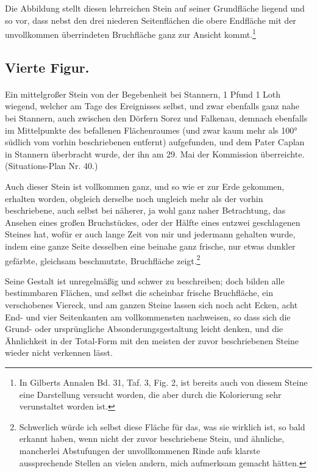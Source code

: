 \documentclass[a4paper, 11pt, oneside, german]{article}
\begin{document}
Die Abbildung stellt diesen lehrreichen Stein auf seiner Grundfläche liegend und so vor, dass nebst den drei niederen Seitenflächen die obere Endfläche mit der unvollkommen überrindeten Bruchfläche ganz zur Ansicht kommt.\footnote{In Gilberts Annalen Bd. 31, Taf. 3, Fig. 2, ist bereits auch von diesem Steine eine Darstellung versucht worden, die aber durch die Kolorierung sehr verunstaltet worden ist.}

\subsection{Vierte Figur.}
\paragraph{}
Ein mittelgroßer Stein von der Begebenheit bei Stannern, 1 Pfund 1 Loth wiegend, welcher am Tage des Ereignisses selbst, und zwar ebenfalls ganz nahe bei Stannern, auch zwischen den Dörfern Sorez und Falkenau, demnach ebenfalls im Mittelpunkte des befallenen Flächenraumes (und zwar kaum mehr als 100° südlich vom vorhin beschriebenen entfernt) aufgefunden, und dem Pater Caplan in Stannern überbracht wurde, der ihn am 29. Mai der Kommission überreichte. (Situations-Plan Nr. 40.)

Auch dieser Stein ist vollkommen ganz, und so wie er zur Erde gekommen, erhalten worden, obgleich derselbe noch ungleich mehr als der vorhin beschriebene, auch selbst bei näherer, ja wohl ganz naher Betrachtung, das Ansehen eines großen Bruchstückes, oder der Hälfte eines entzwei geschlagenen Steines hat, wofür er auch lange Zeit von mir und jedermann gehalten wurde, indem eine ganze Seite desselben eine beinahe ganz frische, nur etwas dunkler gefärbte, gleichsam beschmutzte, Bruchfläche zeigt.\footnote{Schwerlich würde ich selbst diese Fläche für das, was sie wirklich ist, so bald erkannt haben, wenn nicht der zuvor beschriebene Stein, und ähnliche, mancherlei Abstufungen der unvollkommenen Rinde aufs klarste aussprechende Stellen an vielen andern, mich aufmerksam gemacht hätten.}

Seine Gestalt ist unregelmäßig und schwer zu beschreiben; doch bilden alle bestimmbaren Flächen, und selbst die scheinbar frische Bruchfläche, ein verschobenes Viereck, und am ganzen Steine lassen sich noch acht Ecken, acht End- und vier Seitenkanten am vollkommensten nachweisen, so dass sich die Grund- oder ursprüngliche Absonderungsgestaltung leicht denken, und die Ähnlichkeit in der Total-Form mit den meisten der zuvor beschriebenen Steine wieder nicht verkennen lässt.
\end{document}
